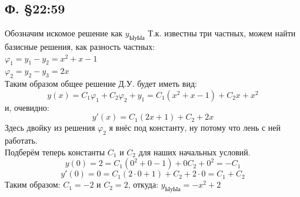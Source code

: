 \documentclass{article}
\begin{document}
\subsection{Ф. \S22:59}
Обозначим искомое решение как $y_{\text{ЫуЫа}}$
Т.к. известны три частных, можем найти базисные решения, как разность частных:\\
$\varphi_1=y_1-y_2 = x^2+x-1$\\
$\varphi_2=y_2-y_3 = 2x$\\
Таким образом общее решение Д.У. будет иметь вид:
\begin{equation}
    y(x)=C_1\varphi_1+C_2\varphi_2+y_1=C_1(x^2+x-1)+C_2x+x^2
\end{equation}
и, очевидно:
\begin{equation}
    y'(x)=C_1(2x+1)+C_2+2x
\end{equation}
Здесь двойку из решения $\varphi_2$ я внёс под константу, ну потому что лень с ней работать.\\
Подберём теперь константы $C_1$ и $C_2$ для наших начальных условий.
\begin{equation}
    y(0)=2=C_1(0^2+0-1)+0 C_2+0^2=-C_1
\end{equation}
\begin{equation}
    y'(0)=0=C_1(2\cdot 0+1)+C_2+2 \cdot 0=C_1+C_2
\end{equation}
Таким образом: $C_1=-2$ и $C_2=2$, откуда: $y_{\text{ЫуЫа}}=-x^2+2$
\end{document}
